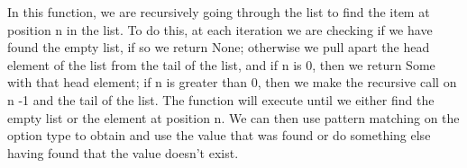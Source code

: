 \noindent
In this function, we are recursively going through the list to find the item at position n in the list.
To do this, at each iteration we are checking if we have found the empty list, if so we return None; 
otherwise we pull apart the head element of the list from the tail of the list, and if n is 0, then we return Some with that head element; 
if n is greater than 0, then we make the recursive call on n -1 and the tail of the list. 
The function will execute until we either find the empty list or the element at position n.
We can then use pattern matching on the option type to obtain and use the value that was found or do something else having found that the value doesn't exist.








